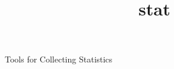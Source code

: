 \documentclass [12pt]{article}
\begin{document}
\begin{titlepage}
\title{stat}{Tools for Collecting Statistics}

\vfill
\end{titlepage}
\tableofcontents




















\end{document}
